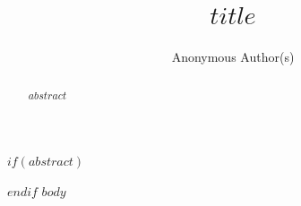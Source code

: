 \documentclass{article}
\title{$title$}
\author{Anonymous Author(s)}
\begin{document}
\maketitle
$if(abstract)$
\begin{abstract}
$abstract$
\end{abstract}
$endif$
$body$
\clearpage
{\small


}
\end{document}
